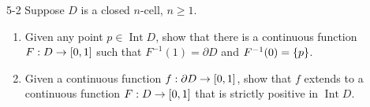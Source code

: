 \begin{problem}{5-2}\label{problem:5-2}
Suppose \( D \) is a closed \( n \)-cell, \( n\geq 1 \).
\begin{enumerate}[label={(\alph*)}]
	\item Given any point \( p\in \operatorname{Int} D \), show that there is a continuous function \( F: D \to \left[{0, 1}\right] \) such that \( F^{-1}(1) = \partial D \) and \( F^{-1}(0) = \left\{{p}\right\} \).
	\item Given a continuous function \( f: \partial D \to \left[{0, 1}\right] \), show that \( f \) extends to a continuous function \( F: D \to \left[{0, 1}\right] \) that is strictly positive in \( \operatorname{Int} D \).
\end{enumerate}
\end{problem}


